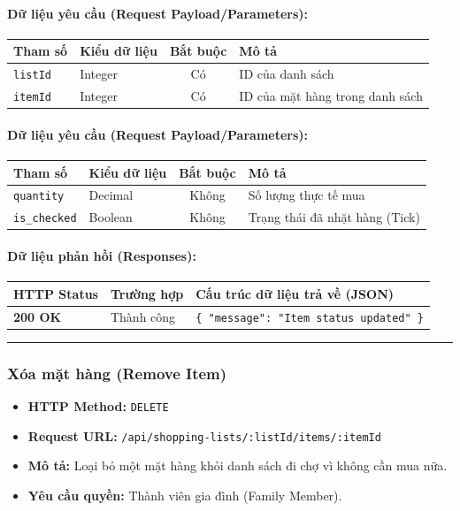 \documentclass[12pt,a4paper]{article}
\begin{document}
\paragraph{Dữ liệu yêu cầu (Request Payload/Parameters):}
\begin{longtable}{|p{2.8cm}|p{2.2cm}|c|p{7.0cm}|}
\hline
\textbf{Tham số} & \textbf{Kiểu dữ liệu} & \textbf{Bắt buộc} & \textbf{Mô tả} \\ \hline
\endhead
\texttt{listId} & Integer & Có & ID của danh sách \\ \hline
\texttt{itemId} & Integer & Có & ID của mặt hàng trong danh sách \\ \hline
\end{longtable}

\paragraph{Dữ liệu yêu cầu (Request Payload/Parameters):}
\begin{longtable}{|p{2.8cm}|p{2.2cm}|c|p{7.0cm}|}
\hline
\textbf{Tham số} & \textbf{Kiểu dữ liệu} & \textbf{Bắt buộc} & \textbf{Mô tả} \\ \hline
\endhead
\texttt{quantity} & Decimal & Không & Số lượng thực tế mua \\ \hline
\texttt{is\_checked} & Boolean & Không & Trạng thái đã nhặt hàng (Tick) \\ \hline
\end{longtable}

\paragraph{Dữ liệu phản hồi (Responses):}
\begin{longtable}{|p{2.8cm}|p{3.2cm}|p{8.0cm}|}
\hline
\textbf{HTTP Status} & \textbf{Trường hợp} & \textbf{Cấu trúc dữ liệu trả về (JSON)} \\ \hline
\endhead
\textbf{200 OK} & Thành công & \texttt{\{ "message": "Item status updated" \}} \\ \hline
\end{longtable}

\vskip 0.4cm
\noindent\rule{\textwidth}{0.3pt}
\vskip 0.4cm

\subsubsection{Xóa mặt hàng (Remove Item)}
\begin{itemize}[leftmargin=*]
    \item \textbf{HTTP Method:} \texttt{DELETE}
    \item \textbf{Request URL:} \texttt{/api/shopping-lists/:listId/items/:itemId}
    \item \textbf{Mô tả:} Loại bỏ một mặt hàng khỏi danh sách đi chợ vì không cần mua nữa.
    \item \textbf{Yêu cầu quyền:} Thành viên gia đình (Family Member).
\end{itemize}
\end{document}
